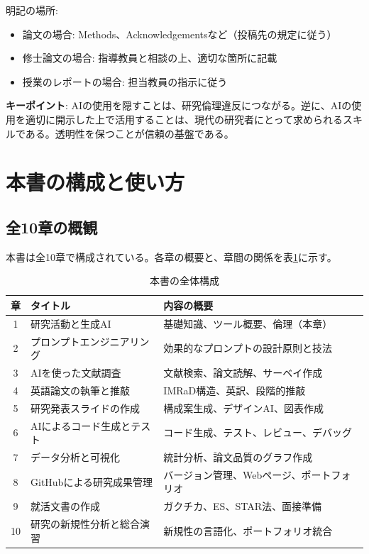 明記の場所:
\begin{itemize}
\item 論文の場合: Methods、Acknowledgementsなど（投稿先の規定に従う）
\item 修士論文の場合: 指導教員と相談の上、適切な箇所に記載
\item 授業のレポートの場合: 担当教員の指示に従う
\end{itemize}

\begin{screen}
\textbf{キーポイント}: AIの使用を隠すことは、研究倫理違反につながる。逆に、AIの使用を適切に開示した上で活用することは、現代の研究者にとって求められるスキルである。透明性を保つことが信頼の基盤である。
\end{screen}

\section{本書の構成と使い方}
\label{sec:1.5}

\subsection{全10章の概観}

本書は全10章で構成されている。各章の概要と、章間の関係を表\ref{tab:book_structure}に示す。

\begin{table}[htbp]
\centering
\caption{本書の全体構成}
\label{tab:book_structure}
\footnotesize
\begin{tabular}{cll}
\toprule
章 & タイトル & 内容の概要 \\
\midrule
1 & 研究活動と生成AI & 基礎知識、ツール概要、倫理（本章） \\
2 & プロンプトエンジニアリング & 効果的なプロンプトの設計原則と技法 \\
3 & AIを使った文献調査 & 文献検索、論文読解、サーベイ作成 \\
4 & 英語論文の執筆と推敲 & IMRaD構造、英訳、段階的推敲 \\
5 & 研究発表スライドの作成 & 構成案生成、デザインAI、図表作成 \\
6 & AIによるコード生成とテスト & コード生成、テスト、レビュー、デバッグ \\
7 & データ分析と可視化 & 統計分析、論文品質のグラフ作成 \\
8 & GitHubによる研究成果管理 & バージョン管理、Webページ、ポートフォリオ \\
9 & 就活文書の作成 & ガクチカ、ES、STAR法、面接準備 \\
10 & 研究の新規性分析と総合演習 & 新規性の言語化、ポートフォリオ統合 \\
\bottomrule
\end{tabular}
\end{table}

